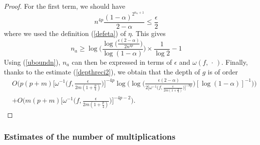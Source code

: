 \documentclass[anon,12pt]{colt2021} %
\begin{document}
\begin{proof}
For the first term, we should have
\begin{equation*}
    n^{4p} \frac{(1-\alpha)^{2^{n_{a}+1}}}{2-\alpha} \leq \frac{\epsilon}{2}
\end{equation*}
where we used the definition (\ref{defeta}) of $\eta$. This gives
\begin{equation*}
    n_{a} \geq \log \bigg( \frac{\log \big(\frac{\epsilon (2-\alpha)}{2n^{4p}} \big)}{\log(1-\alpha)} \bigg) \times \frac{1}{\log 2} - 1
\end{equation*}
Using (\ref{uboundn}), $n_{a}$ can then be expressed in terms of $\epsilon$ and $\omega(f, \, \cdot \,)$. Finally, thanks to the estimate (\ref{depthreci2}), we obtain that the depth of $g$ is of order
\begin{align*}
    &O\bigg(p(p+m) \big[ \omega^{-1} \big(f, \frac{\epsilon }{2m(1+\frac{p}{4})}\big) \big]^{-4p} \log \bigg( \log \big(\frac{\epsilon (2-\alpha)}{2\big[ \omega^{-1}\big(f, \frac{\epsilon}{2m(1+\frac{p}{4})}\big) \big]^{-8p}} \big) [ \log(1-\alpha) ]^{-1} \bigg) \bigg) \\
    &+O\bigg( m(p+m) \big[ \omega^{-1}\big(f, \frac{\epsilon}{2m(1+\frac{p}{4})}\big) \big]^{-4p-2} \bigg).
\end{align*}
\end{proof}

\subsubsection{Estimates of the number of multiplications} \label{EstMonomial}
\end{document}
